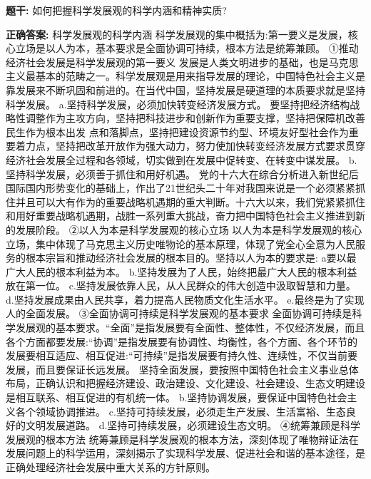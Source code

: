 \documentclass[12pt,UTF8]{ctexart}
\begin{document}
\textbf{题干:}
如何把握科学发展观的科学内涵和精神实质?

\textbf{正确答案:}
科学发展观的科学内涵
科学发展观的集中概括为:第一要义是发展，核心立场是以人为本，基本要求是全面协调可持续，根本方法是统筹兼顾。
①推动经济社会发展是科学发展观的第一要义
发展是人类文明进步的基础，也是马克思主义最基本的范畴之一。科学发展观是用来指导发展的理论，中国特色社会主义是靠发展来不断巩固和前进的。在当代中国，坚持发展是硬道理的本质要求就是坚持科学发展。
a.坚持科学发展，必须加快转变经济发展方式。
要坚持把经济结构战略性调整作为主攻方向，坚持把科技进步和创新作为重要支撑，坚持把保障机改善民生作为根本出发
点和落脚点，坚持把建设资源节约型、环境友好型社会作为重要着力点，坚持把改革开放作为强大动力，努力使加快转变经济发展方式要求贯穿经济社会发展全过程和各领域，切实做到在发展中促转变、在转变中谋发展。
b.坚持科学发展，必须善于抓住和用好机遇。
党的十六大在综合分析进入新世纪后国际国内形势变化的基础上，作出了21世纪头二十年对我国来说是一个必须紧紧抓住并且可以大有作为的重要战略机遇期的重大判断。十六大以来，我们党紧紧抓住和用好重要战略机遇期，战胜一系列重大挑战，奋力把中国特色社会主义推进到新的发展阶段。
②以人为本是科学发展观的核心立场
以人为本是科学发展观的核心立场，集中体现了马克思主义历史唯物论的基本原理，体现了党全心全意为人民服务的根本宗旨和推动经济社会发展的根本目的。坚持以人为本的要求是:
a要以最广大人民的根本利益为本。
b.坚持发展为了人民，始终把最广大人民的根本利益放在第一位。
c.坚持发展依靠人民，从人民群众的伟大创造中汲取智慧和力量。
d.坚持发展成果由人民共享，着力提高人民物质文化生活水平。
e.最终是为了实现人的全面发展。
③全面协调可持续是科学发展观的基本要求
全面协调可持续是科学发展观的基本要求。“全面”是指发展要有全面性、整体性，不仅经济发展，而且各个方面都要发展:“协调”是指发展要有协调性、均衡性，各个方面、各个环节的发展要相互适应、相互促进:“可持续”是指发展要有持久性、连续性，不仅当前要发展，而且要保证长远发展。
坚持全面发展，要按照中国特色社会主义事业总体布局，正确认识和把握经济建设、政治建设、文化建设、社会建设、生态文明建设是相互联系、相互促进的有机统一体。
b.坚持协调发展，要保证中国特色社会主义各个领域协调推进。
c.坚持可持续发展，必须走生产发展、生活富裕、生态良好的文明发展道路。
d.坚持可持续发展，必须建设生态文明。
④统筹兼顾是科学发展观的根本方法
统筹兼顾是科学发展观的根本方法，深刻体现了唯物辩证法在发展问题上的科学运用，深刻揭示了实现科学发展、促进社会和谐的基本途径，是正确处理经济社会发展中重大关系的方针原则。
\end{document}
